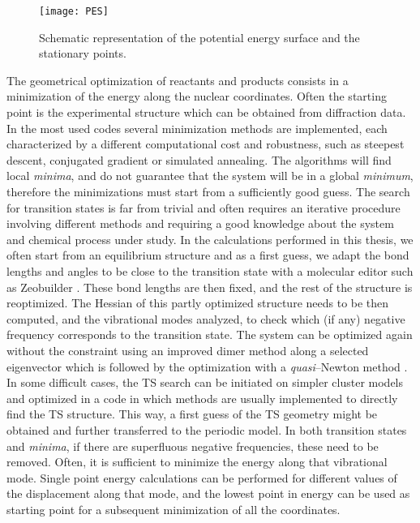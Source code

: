 \begin{figure}[!htbp]
	\centering
 	\texttt{[image: PES]}
	\caption{Schematic representation of the potential energy surface and the stationary points.}
	\label{fig:PES}
\end{figure}

The geometrical optimization of reactants and products consists in a minimization of the energy along the nuclear coordinates. Often the starting point is the experimental structure which can be obtained from diffraction data. In the most used codes several minimization methods are implemented, each characterized by a different computational cost and robustness, such as steepest descent, conjugated gradient or simulated annealing. The algorithms will find local \textit{minima}, and do not guarantee that the system will be in a global \textit{minimum}, therefore the minimizations must start from a sufficiently good guess. 
\npar
The search for transition states is far from trivial and often requires an iterative procedure involving different methods and requiring a good knowledge about the system and chemical process under study. In the calculations performed in this thesis, we often start from an equilibrium structure and as a first guess, we adapt the bond lengths and angles to be close to the transition state with a molecular editor such as Zeobuilder \cite{Verstraelen2008}. These bond lengths are then fixed, and the rest of the structure is reoptimized. The Hessian of this partly optimized structure needs to be then computed, and the vibrational modes analyzed, to check which (if any) negative frequency corresponds to the transition state. The system can be optimized again without the constraint using an improved dimer method along a selected eigenvector \cite{Heyden2005} which is followed by the optimization with a \textit{quasi}--Newton method \cite{Press1989}. In some difficult cases, the TS search can be initiated on simpler cluster models and optimized in a code in which methods are usually implemented to directly find the TS structure. This way, a first guess of the TS geometry might be obtained and further transferred to the periodic model. In both transition states and \textit{minima}, if there are superfluous negative frequencies, these need to be removed. Often, it is sufficient to minimize the energy along that vibrational mode. Single point energy calculations can be performed for different values of the displacement along that mode, and the lowest point in energy can be used as starting point for a subsequent minimization of all the coordinates.

